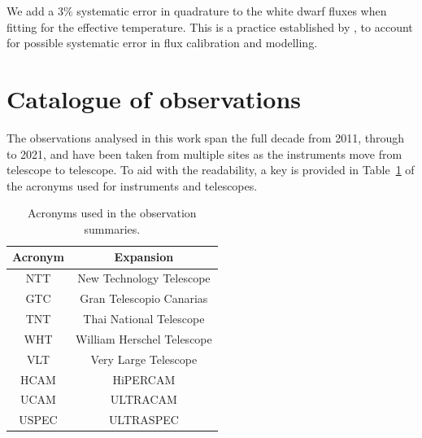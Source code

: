 We add a 3\% systematic error in quadrature to the white dwarf fluxes when fitting for the effective temperature. This is a practice established by \citet{McAllister2019}, to account for possible systematic error in flux calibration and modelling.

\newpage
\section{Catalogue of observations}

The observations analysed in this work span the full decade from 2011, through to 2021, and have been taken from multiple sites as the instruments move from telescope to telescope. To aid with the readability, a key is provided in Table~\ref{tab:observation acronyms} of the acronyms used for instruments and telescopes. 

\begin{table}
    \centering
    \begin{tabular}{c|c}
        Acronym & Expansion \\
        \hline
        NTT & New Technology Telescope \\
        GTC & Gran Telescopio Canarias \\
        TNT & Thai National Telescope \\
        WHT & William Herschel Telescope \\
        VLT & Very Large Telescope \\ 
        HCAM & HiPERCAM \\
        UCAM & ULTRACAM \\
        USPEC & ULTRASPEC \\
    \end{tabular}
    \caption{Acronyms used in the observation summaries.}
    \label{tab:observation acronyms}
\end{table}
